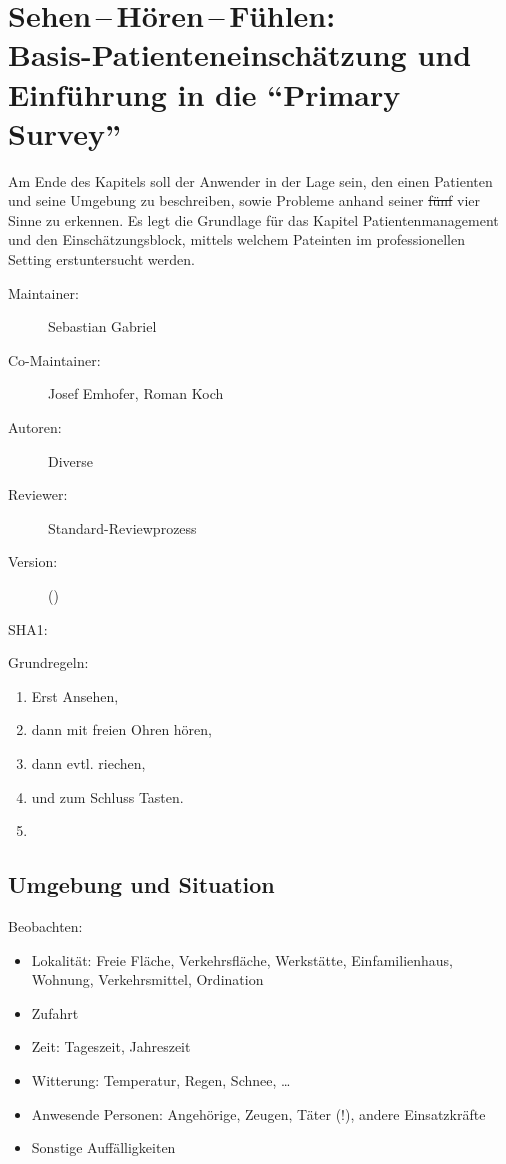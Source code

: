 \def\ChapterCode{SHF}
\chapter
[\CO{[SHF]} Sehen\,--\,Hören\,--\,Fühlen]
{Sehen\,--\,Hören\,--\,Fühlen:\\Basis-Patienteneinschätzung und Einführung in die \enquote{Primary Survey}}
\label{chp:BET}

\ChapterIntro
{%
Am Ende des Kapitels soll der Anwender in der Lage sein,
den einen Patienten und seine Umgebung zu beschreiben, sowie
Probleme anhand seiner \sout{fünf} vier Sinne zu erkennen.
Es legt die Grundlage für das Kapitel Patientenmanagement und den
Einschätzungsblock, mittels welchem Pateinten im
professionellen Setting erstuntersucht werden.

}{%
\begin{description}
  \item[Maintainer:] Sebastian Gabriel
  \item[Co-Maintainer:] Josef Emhofer, Roman Koch
  \item[Autoren:] Diverse
  \item[Reviewer:] Standard-Reviewprozess
  \item[Version:] {\DocVersion} ({\DocVersionInfo})
  \item[SHA1:] {\DocGitCommit}
\end{description}

{\TxTeilkapitelAASS}
}

Grundregeln:

\begin{enumerate}
  \item Erst Ansehen,
  \item dann mit freien Ohren hören,
  \item dann evtl. riechen,
  \item und zum Schluss Tasten.
  \item {}
\end{enumerate}


\section{Umgebung und Situation}

Beobachten:

\begin{itemize}
  \item Lokalität: Freie Fläche, Verkehrsfläche, Werkstätte,
  Einfamilienhaus, Wohnung, Verkehrsmittel, Ordination
  \item Zufahrt
  \item Zeit: Tageszeit, Jahreszeit
  \item Witterung: Temperatur, Regen, Schnee, \ldots
  \item Anwesende Personen: Angehörige, Zeugen, Täter (!),
  andere Einsatzkräfte
  \item Sonstige Auffälligkeiten
\end{itemize}

